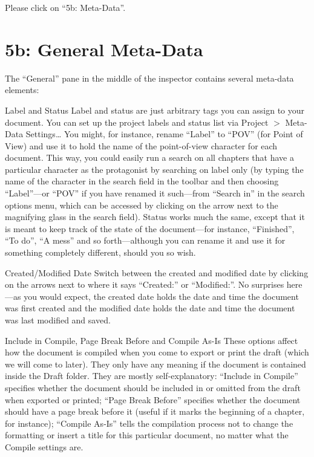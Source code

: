 \documentclass[10pt,oneside]{memoir}
\begin{document}
Please click on ``5b: Meta-Data''.


\pagebreak \section{5b: General Meta-Data}
\label{b:generalmeta-data}

The ``General'' pane in the middle of the inspector contains several meta-data elements:


Label and Status
Label and status are just arbitrary tags you can assign to your document. You can set up the project labels and status list via Project $>$ Meta-Data Settings{\ldots} You might, for instance, rename ``Label'' to ``POV'' (for Point of View) and use it to hold the name of the point-of-view character for each document. This way, you could easily run a search on all chapters that have a particular character as the protagonist by searching on label only (by typing the name of the character in the search field in the toolbar and then choosing ``Label''---or ``POV'' if you have renamed it such---from ``Search in'' in the search options menu, which can be accessed by clicking on the arrow next to the magnifying glass in the search field). Status works much the same, except that it is meant to keep track of the state of the document---for instance, ``Finished'', ``To do'', ``A mess'' and so forth---although you can rename it and use it for something completely different, should you so wish.


Created/Modified Date
Switch between the created and modified date by clicking on the arrows next to where it says ``Created:'' or ``Modified:''. No surprises here---as you would expect, the created date holds the date and time the document was first created and the modified date holds the date and time the document was last modified and saved.


Include in Compile, Page Break Before and Compile As-Is
These options affect how the document is compiled when you come to export or print the draft (which we will come to later). They only have any meaning if the document is contained inside the Draft folder. They are mostly self-explanatory: ``Include in Compile'' specifies whether the document should be included in or omitted from the draft when exported or printed; ``Page Break Before'' specifies whether the document should have a page break before it (useful if it marks the beginning of a chapter, for instance); ``Compile As-Is'' tells the compilation process not to change the formatting or insert a title for this particular document, no matter what the Compile settings are.
\end{document}
